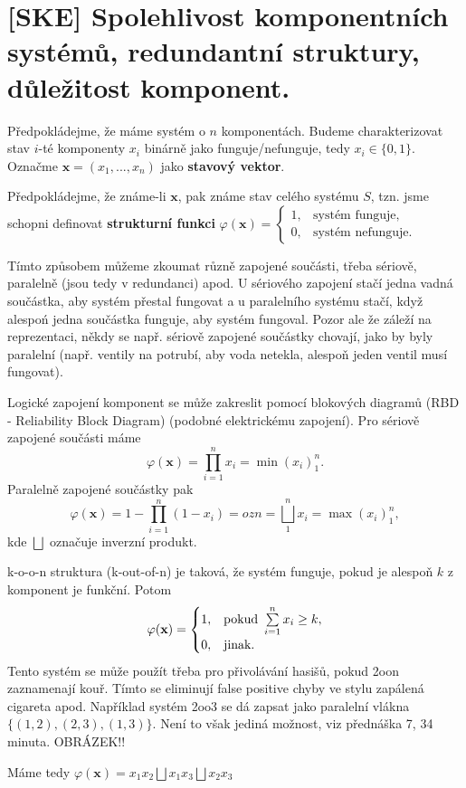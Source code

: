 \chapter{[SKE] Spolehlivost komponentních systémů, redundantní struktury, důležitost komponent.}


\begin{define}
	Předpokládejme, že máme systém o $n$ komponentách. Budeme charakterizovat stav $i$-té komponenty $x_i$ binárně jako funguje/nefunguje, tedy $x_i\in\{0,1\}$. Označme $\textbf{x}=(x_1,...,x_n)$ jako \textbf{stavový vektor}. 
	
	Předpokládejme, že známe-li $\textbf{x}$, pak známe stav celého systému $S$, tzn. jsme schopni definovat \textbf{strukturní funkci} $\varphi(\textbf{x})=\begin{cases}
	1,&\text{systém funguje,}\\0,&\text{systém nefunguje.}
	\end{cases}$
\end{define}

Tímto způsobem můžeme zkoumat různě zapojené součásti, třeba sériově, paralelně (jsou tedy v redundanci) apod. U sériového zapojení stačí jedna vadná součástka, aby systém přestal fungovat a u paralelního systému stačí, když alespoń jedna součástka funguje, aby systém fungoval. Pozor ale že záleží na reprezentaci, někdy se např. sériově zapojené součástky chovají, jako by byly paralelní (např. ventily na potrubí, aby voda netekla, alespoň jeden ventil musí fungovat).

\begin{corollary}
	Logické zapojení komponent se může zakreslit pomocí blokových diagramů (RBD - Reliability Block Diagram) (podobné elektrickému zapojení). Pro sériově zapojené součásti máme 
$$ \varphi(\textbf{x})=\prod_{i=1}^{n}x_i=\min(x_i)_1^n.$$
Paralelně zapojené součástky pak
$$ \varphi(\textbf{x})=1-\prod_{i=1}^{n}(1-x_i)\equal{ozn}=\bigsqcup_1^n x_i=\max(x_i)_1^n, $$ kde $\bigsqcup$ označuje inverzní produkt.
\end{corollary}

\begin{corollary}
	k-o-o-n struktura (k-out-of-n) je taková, že systém funguje, pokud je alespoň $k$ z komponent je funkční. Potom
	$$ \varphi(\textbf{x})=\begin{cases}
	1,&\text{pokud }\sum\limits_{i=1}^{n} x_i\geq k,\\0,& \text{jinak.}
	\end{cases}$$
	Tento systém se může použít třeba pro přivolávání hasišů, pokud 2oon zaznamenají kouř. Tímto se eliminují false positive chyby ve stylu zapálená cigareta apod. Například systém 2oo3 se dá zapsat jako paralelní vlákna $\{(1,2), (2,3),(1,3)\}$. Není to však jediná možnost, viz přednáška 7, 34 minuta. OBRÁZEK!!
	
	Máme tedy $\varphi(\textbf{x})=x_1x_2\bigsqcup x_1x_3\bigsqcup x_2x_3$
\end{corollary}

